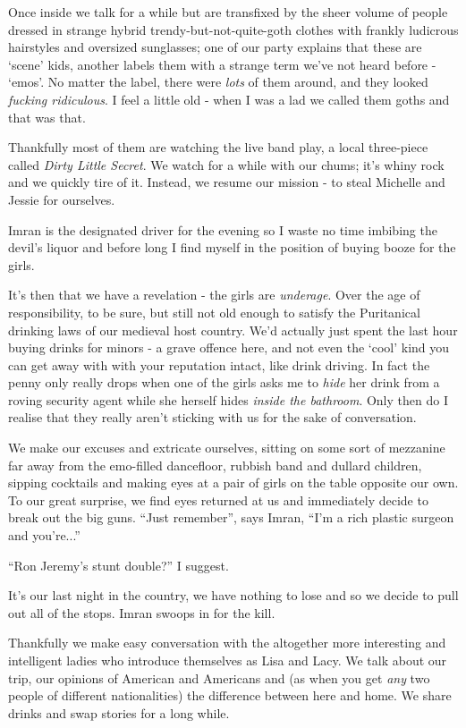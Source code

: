 \documentclass[a5paper,titlepage,11pt]{book}
\begin{document}
Once inside we talk for a while but are transfixed by the sheer volume of people dressed in strange hybrid trendy-but-not-quite-goth clothes with frankly ludicrous hairstyles and oversized sunglasses; one of our party explains that these are `scene' kids, another labels them with a strange term we've not heard before - `emos'. No matter the label, there were \emph{lots} of them around, and they looked \emph{fucking ridiculous}. I feel a little old - when I was a lad we called them goths and that was that.

Thankfully most of them are watching the live band play, a local three-piece called \emph{Dirty Little Secret}. We watch for a while with our chums; it's whiny rock and we quickly tire of it. Instead, we resume our mission - to steal Michelle and Jessie for ourselves.

Imran is the designated driver for the evening so I waste no time imbibing the devil's liquor and before long I find myself in the position of buying booze for the girls.

It's then that we have a revelation - the girls are \emph{underage}. Over the age of responsibility, to be sure, but still not old enough to satisfy the Puritanical drinking laws of our medieval host country. We'd actually just spent the last hour buying drinks for minors - a grave offence here, and not even the `cool' kind you can get away with with your reputation intact, like drink driving. In fact the penny only really drops when one of the girls asks me to \emph{hide} her drink from a roving security agent while she herself hides \emph{inside the bathroom}. Only then do I realise that they really aren't sticking with us for the sake of conversation.

We make our excuses and extricate ourselves, sitting on some sort of mezzanine far away from the emo-filled dancefloor, rubbish band and dullard children, sipping cocktails and making eyes at a pair of girls on the table opposite our own. To our great surprise, we find eyes returned at us and immediately decide to break out the big guns. ``Just remember'', says Imran, ``I'm a rich plastic surgeon and you're...''

``Ron Jeremy's stunt double?'' I suggest.

It's our last night in the country, we have nothing to lose and so we decide to pull out all of the stops. Imran swoops in for the kill.

Thankfully we make easy conversation with the altogether more interesting and intelligent ladies who introduce themselves as Lisa and Lacy. We talk about our trip, our opinions of American and Americans and (as when you get \emph{any} two people of different nationalities) the difference between here and home. We share drinks and swap stories for a long while.
\end{document}
